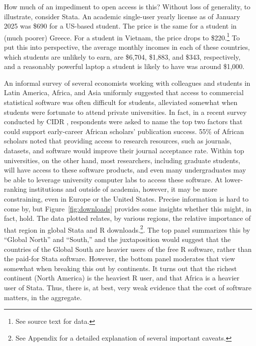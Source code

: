 \documentclass{article}
\begin{document}
How much of an impediment to open access is this? Without loss of generality, to illustrate, consider Stata. An academic single-user yearly license as of January 2025 was \$690 for a US-based student. The price is the same for a student in (much poorer) Greece. For a student in Vietnam, the price drops to \$220.\footnote{See source text for data.}  To put this into perspective, the average monthly incomes in each of these countries, which students are unlikely to earn, are \$6,704, \$1,883, and \$343, respectively, and a reasonably powerful laptop a student is likely to have was around \$1,000. 




An informal survey of several economists working with colleagues and students in Latin America, Africa, and Asia uniformly suggested that access to commercial statistical software was often difficult for students, alleviated somewhat when students were fortunate to attend private universities. In fact, in a recent survey conducted by CIDR \citep{shipow-cidr}, respondents were asked to name the top two factors that could support early-career African scholars’ publication success. 
55\% of African scholars noted that providing access to research resources, such as journals, datasets, and software would improve their journal acceptance rate.%
%
Within top universities, on the other hand, most researchers, including graduate students, will have access to these software products, and even many undergraduates may be able to leverage university computer labs to access these software. At lower-ranking institutions and outside of academia, however, it may be more constraining, even in Europe or the United States. Precise information is hard to come by, but  Figure~\ref{fig:downloads} provides some insights whether this might, in fact, hold. The data plotted relates, by various regions, the relative importance of that region in global Stata and R downloads.\footnote{See Appendix for a detailed explanation of several important caveats.}. The top panel summarizes this by ``Global North'' and ``South,'' and the juxtaposition would suggest that the countries of the Global South are heavier users of the free R software, rather than the paid-for Stata software. However, the bottom panel moderates that view somewhat when breaking this out by continents. It turns out that the richest continent (North America) is the heaviest R user, and that Africa is a heavier user of Stata. Thus, there is, at best, very weak evidence that the cost of software matters, in the aggregate.  
\end{document}
